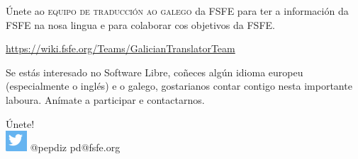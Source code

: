 \documentclass[10pt,foldmark,tumble]{leaflet}
\begin{document}
\begin{mdframed}[style=MyFrame]
Únete ao \textsc{equipo de traducción ao galego} da FSFE para ter a información da FSFE na nosa lingua e para colaborar cos objetivos da FSFE.

\vspace{1em}
\url{https://wiki.fsfe.org/Teams/GalicianTranslatorTeam}
\vspace{1em}

Se estás interesado no Software Libre, coñeces algún idioma europeu (especialmente o inglés) e o galego, gostarianos contar contigo nesta importante laboura. Anímate a participar e contactarnos.

\center \Huge{Únete!}  \\
\vspace{1em}
\includegraphics[scale=0.8]{tw.png} \Large @pepdiz \hspace{1em} pd@fsfe.org
\end{mdframed}
\end{document}
